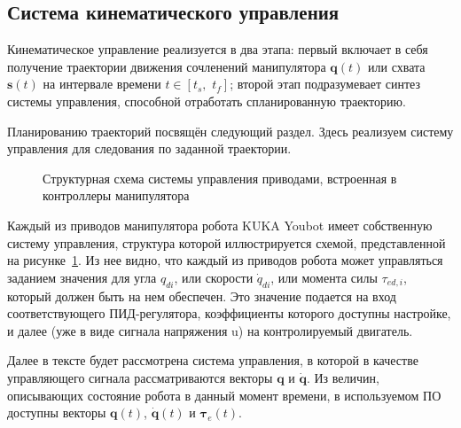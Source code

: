 \subsection{Система кинематического управления}\label{part_kinematic_control}

Кинематическое управление реализуется в два этапа: первый включает в себя получение траектории движения сочленений манипулятора $ \bm{q}(t) $ или схвата $ \bm{s}(t) $ на интервале времени $ t \in [t_s,\,\,t_f] $; второй этап подразумевает синтез системы управления, способной отработать спланированную траекторию.

Планированию траекторий посвящён следующий раздел. Здесь реализуем систему управления для следования по заданной траектории.

\begin{figure}[h!]
	\vspace{0.5cm}
	\caption{Структурная схема системы управления приводами, встроенная в контроллеры манипулятора}
	\label{img:structure_of_actuator_cs}
\end{figure}

Каждый из приводов манипулятора робота KUKA Youbot имеет собственную систему управления, структура которой иллюстрируется схемой, представленной на рисунке~\ref{img:structure_of_actuator_cs}. Из нее видно, что каждый из приводов робота может управляться заданием значения для угла $ q_{di} $, или скорости $ \dot{q}_{di} $, или момента силы $ \tau_{ed,i} $, который должен быть на нем обеспечен. Это значение подается на вход соответствующего ПИД-регулятора, коэффициенты которого доступны настройке, и далее (уже в виде сигнала напряжения u) на контролируемый двигатель.

Далее в тексте будет рассмотрена система управления, в которой в качестве управляющего сигнала рассматриваются векторы $ \bm{q} $ и $ \dot{\bm{q}} $. Из величин, описывающих состояние робота в данный момент времени, в используемом ПО доступны векторы $\bm{q}(t)$, $\dot{\bm{q}}(t)$ и $\bm\tau_e (t)$.


